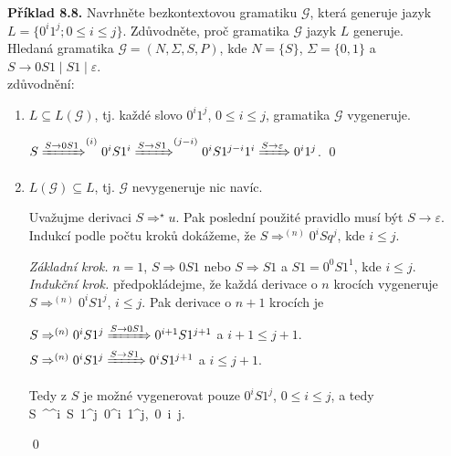 \documentclass[11pt]{article}
\begin{document}
\newpage
\noindent
\textbf{Příklad 8.8.} Navrhněte bezkontextovou gramatiku $\mathcal{G}$, která generuje jazyk ${L = \{0^i1^j; 0 \leq i \leq j\}}$. Zdůvodněte, proč gramatika $\mathcal{G}$ jazyk $L$ generuje.\\

\noindent
Hledaná gramatika $\mathcal{G} = (N, \Sigma, S, P)$, kde $N=\{S\}$, $\Sigma = \{0,1\}$ a $S \rightarrow 0S1 \mid S1 \mid \varepsilon$.\\

\noindent
zdůvodnění:

\begin{enumerate}
    \item $L \subseteq L(\mathcal{G})$, tj. každé slovo $0^i 1^j$, $0 \leq i \leq j$, gramatika $\mathcal{G}$ vygeneruje.

        $S \xRightarrow{S \rightarrow 0S1}^{(i)} 0^i S 1^i \xRightarrow{S \rightarrow S1}^{(j-i)} 0^i S 1^{j-i} 1^i \xRightarrow{S \rightarrow \varepsilon} 0^i 1^j$. \qed
    \item $L(\mathcal{G}) \subseteq L$, tj. $\mathcal{G}$ nevygeneruje nic navíc.

        Uvažujme derivaci $S \Rightarrow^\star u$. Pak poslední použité pravidlo musí být $S \rightarrow \varepsilon$. Indukcí podle počtu kroků dokážeme, že $S \Rightarrow ^{(n)} 0^i S q^j$, kde $i \leq j$.

        \textit{Základní krok.} $n=1$, $S \Rightarrow 0S1$ nebo $S \Rightarrow S1$ a $S1 = 0^0 S 1^1$, kde $i \leq j$.\\
        \textit{Indukční krok.} předpokládejme, že každá derivace o $n$ krocích vygeneruje $S \Rightarrow^{(n)} 0^i S 1^j$, $i \leq j$.
        Pak derivace o $n+1$ krocích je
        \begin{cases*}
            $S \Rightarrow^{(n)} 0^i S 1^j \xRightarrow{S \rightarrow 0S1} 0^{i+1} S 1^{j+1}$ a $i+1 \leq j+1$. \\
            $S \Rightarrow^{(n)} 0^i S 1^j \xRightarrow{S \rightarrow S1} 0^i S 1^{j+1}$ a $i \leq j+1$. 
        \end{cases*}
        
        Tedy z $S$ je možné vygenerovat pouze $0^i S 1^j$, $0 \leq i \leq j$, a tedy \mbox{S \Rightarrow^^i S 1^j  0^i 1^j, 0 \leq i \leq j}.
        
        \qed
        
\end{enumerate}


 
\end{document}
